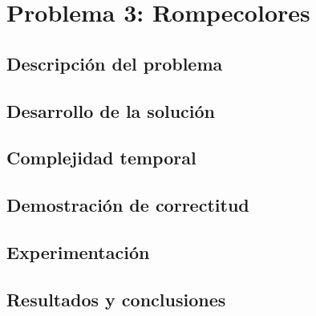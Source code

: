 \documentclass[a4paper, 10pt, twoside]{article}
\begin{document}
\newpage



\section{Problema 3: Rompecolores}

\subsection{Descripción del problema}


\subsection{Desarrollo de la solución}


\subsection{Complejidad temporal}


\subsection{Demostración de correctitud}


\subsection{Experimentación}


\subsection{Resultados y conclusiones}


\newpage



\begin{appendices}



\end{appendices}
\end{document}
